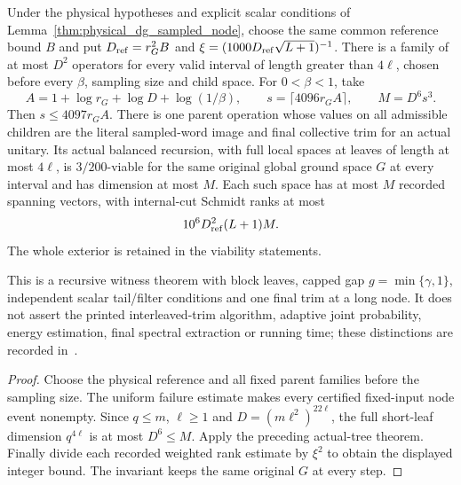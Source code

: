 \begin{lemma}
    \label{thm:physical_dg_recursive_interval_spaces}
    \leanok
    Under the physical hypotheses and explicit scalar conditions of
    Lemma~\ref{thm:physical_dg_sampled_node}, choose the same common
    reference bound $B$ and put $D_{\rm ref}=r_G^2B$ and
    $\xi=(1000D_{\rm ref}\sqrt{L+1})^{-1}$.
    There is a family of at most $D^2$ operators for every valid interval of
    length greater than $4\ell$, chosen before every $\beta$, sampling size
    and child space.
    For $0<\beta<1$, take
    \[
        A=1+\log r_G+\log D+\log(1/\beta),\qquad
        s=\lceil4096r_GA\rceil,\qquad M=D^6s^3.
    \]
    Then $s\le4097r_GA$. There is one parent operation whose values on
    all admissible children are the literal sampled-word image and final
    collective trim for an actual unitary. Its actual balanced recursion,
    with full local spaces at leaves of length at most $4\ell$, is
    $3/200$-viable for the same original global ground space $G$ at
    every interval and has dimension at most $M$.
    Each such space has at most $M$ recorded spanning vectors, with
    internal-cut Schmidt ranks at most
    \[
        10^6D_{\rm ref}^2(L+1)M.
    \]
    The whole exterior is retained in the viability statements.

    This is a recursive witness theorem with block leaves, capped gap
    $g=\min\{\gamma,1\}$, independent scalar tail/filter conditions and
    one final trim at a long node. It does not assert the printed
    interleaved-trim algorithm, adaptive joint probability, energy
    estimation, final spectral extraction or running time; these
    distinctions are recorded in~\cite{gap:alvv16_approximation_parameters}.
\end{lemma}
\begin{proof}\leanok
    Choose the physical reference and all fixed parent families before
    the sampling size. The uniform failure estimate makes every
    certified fixed-input node event nonempty. Since $q\le m$,
    $\ell\ge1$ and $D=(m\ell^2)^{22\ell}$, the full short-leaf dimension
    $q^{4\ell}$ is at most $D^6\le M$. Apply the preceding actual-tree
    theorem. Finally divide each recorded weighted rank estimate by
    $\xi^2$ to obtain the displayed integer bound. The invariant keeps
    the same original $G$ at every step.
\end{proof}


